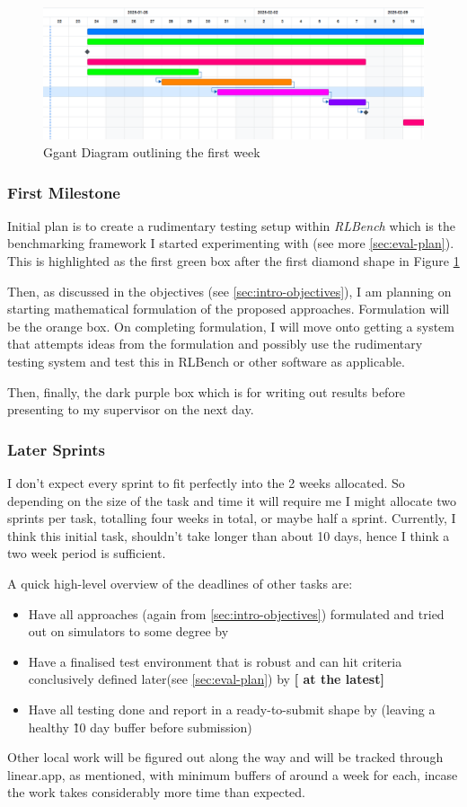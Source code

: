 \begin{figure}[h]
  \centering
  \includegraphics[width=\textwidth]{assets/initial-plan/first-week.png}
  \caption{Ggant Diagram outlining the first week}
  \label{fig:ggant}
\end{figure}

\subsubsection{First Milestone}
Initial plan is to create a rudimentary testing setup within \emph{RLBench} which is the benchmarking framework I started experimenting with (see more \ref{sec:eval-plan}). This is highlighted as the first green box after the first diamond shape in Figure \ref{fig:ggant}

Then, as discussed in the objectives (see \ref{sec:intro-objectives}), I am planning on starting mathematical formulation of the proposed approaches. Formulation will be the orange box. On completing formulation, I will move onto getting a system that attempts ideas from the formulation and possibly use the rudimentary testing system and test this in RLBench or other software as applicable. 

Then, finally, the dark purple box which is for writing out results before presenting to my supervisor on the next day.

\subsubsection{Later Sprints}
I don't expect every sprint to fit perfectly into the 2 weeks allocated. So depending on the size of the task and time it will require me I might allocate two sprints per task, totalling four weeks in total, or maybe half a sprint. Currently, I think this initial task, shouldn't take longer than about 10 days, hence I think a two week period is sufficient.

A quick high-level overview of the deadlines of other tasks are:
\begin{itemize}
  \item Have all approaches (again from \ref{sec:intro-objectives}) formulated and tried out on simulators to some degree by \textbf{}
  \item Have a finalised test environment that is robust and can hit criteria conclusively defined later(see \ref{sec:eval-plan}) by \textbf{ [ at the latest] }
  \item Have all testing done and report in a ready-to-submit shape by \textbf{} (leaving a healthy \~10 day buffer before submission)
\end{itemize}

Other local work will be figured out along the way and will be tracked through linear.app, as mentioned, with minimum buffers of around a week for each, incase the work takes considerably more time than expected.